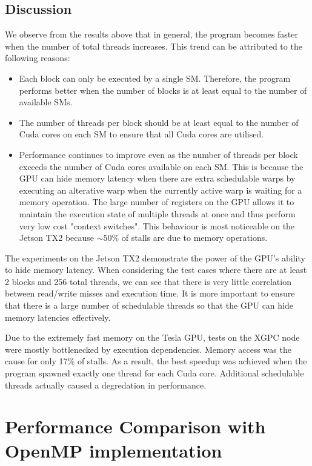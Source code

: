 \documentclass[a4paper,12pt]{article}
\begin{document}
\subsection{Discussion}
We observe from the results above that in general, the program becomes faster when the number of total threads increases. This trend can be attributed to the following reasons:
\begin{itemize}
  \item Each block can only be executed by a single SM. Therefore, the program performs better when the number of blocks is at least equal to the number of available SMs.
  \item The number of threads per block should be at least equal to the number of Cuda cores on each SM to ensure that all Cuda cores are utilised.
  \item Performance continues to improve even as the number of threads per block exceeds the number of Cuda cores available on each SM. This is because the GPU can hide memory latency when there are extra schedulable warps by executing an alterative warp when the currently active warp is waiting for a memory operation. The large number of registers on the GPU allows it to maintain the execution state of multiple threads at once and thus perform very low cost "context switches". This behaviour is most noticeable on the Jetson TX2 because $\sim 50\%$ of stalls are due to memory operations.
\end{itemize}


The experiments on the Jetson TX2 demonstrate the power of the GPU's ability to hide memory latency. When considering the test cases where there are at least 2 blocks and 256 total threads, we can see that there is very little correlation between read/write misses and execution time. It is more important to ensure that there is a large number of schedulable threads so that the GPU can hide memory latencies effectively.

Due to the extremely fast memory on the Tesla GPU, tests on the XGPC node were mostly bottlenecked by execution dependencies. Memory access was the cause for only 17\% of stalls. As a result, the best speedup was achieved when the program spawned exactly one thread for each Cuda core. Additional schedulable threads actually caused a degredation in performance.

\section{Performance Comparison with OpenMP implementation}
\end{document}
